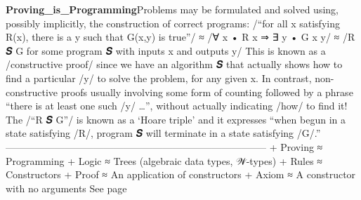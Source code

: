 \documentclass[11pt]{article}
\begin{document}
\vspace{1em}\textbf{Proving_is_Programming}\quad\label{org-special-block-extras-glossary-Proving_is_Programming}Problems may be formulated and solved using, possibly implicitly, the  construction of correct programs:   \quad  \quad  /“for all x satisfying R(x), there is a y such that G(x,y) is true”/  ≈	/∀ x • R x ⇒ ∃ y • G x y/  ≈	/R {𝑺} G for some program 𝑺 with inputs x and outputs y/   This is known as a /constructive proof/ since we have an algorithm 𝑺 that actually  shows how to find a particular /y/ to solve the problem, for any given x. In  contrast, non-constructive proofs usually involving some form of counting  followed by a phrase “there is at least one such /y/ …”, without actually  indicating /how/ to find it!   The /“R {𝑺} G”/ is known as a ‘Hoare triple’ and it expresses “when begun in a  state satisfying /R/, program 𝑺 will terminate in a state satisfying /G/.”   --------------------------------------------------------------------------------   + Proving ≈ Programming  + Logic \quad  ≈ Trees (algebraic data types, 𝒲-types)  + Rules \quad  ≈ Constructors  + Proof \quad  ≈ An application of constructors  + Axiom \quad  ≈ A constructor with no arguments See page \pageref{org-special-block-extras-glossary-declaration-site-Proving_is_Programming}
\end{document}
